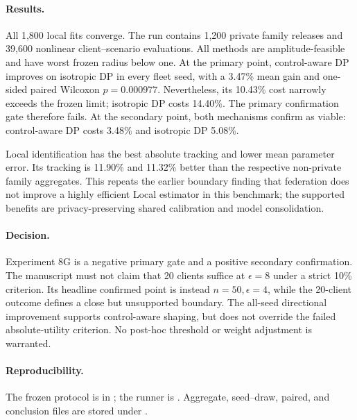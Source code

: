 \paragraph{Results.}
All 1,800 local fits converge. The run contains 1,200 private family releases
and 39,600 nonlinear client--scenario evaluations. All methods are
amplitude-feasible and have worst frozen radius below one. At the primary point,
control-aware DP improves on isotropic DP in every fleet seed, with a 3.47\%
mean gain and one-sided paired Wilcoxon $p=0.000977$. Nevertheless, its 10.43\%
cost narrowly exceeds the frozen limit; isotropic DP costs 14.40\%. The primary
confirmation gate therefore fails. At the secondary point, both mechanisms
confirm as viable: control-aware DP costs 3.48\% and isotropic DP 5.08\%.

Local identification has the best absolute tracking and lower mean parameter
error. Its tracking is 11.90\% and 11.32\% better than the respective
non-private family aggregates. This repeats the earlier boundary finding that
federation does not improve a highly efficient Local estimator in this
benchmark; the supported benefits are privacy-preserving shared calibration and
model consolidation.

\paragraph{Decision.}
Experiment 8G is a negative primary gate and a positive secondary confirmation.
The manuscript must not claim that 20 clients suffice at $\epsilon=8$ under a
strict 10\% criterion. Its headline confirmed point is instead
$n=50,\epsilon=4$, while the 20-client outcome defines a close but unsupported
boundary. The all-seed directional improvement supports control-aware shaping,
but does not override the failed absolute-utility criterion. No post-hoc
threshold or weight adjustment is warranted.

\paragraph{Reproducibility.}
The frozen protocol is in ; the runner is
. Aggregate,
seed--draw, paired, and conclusion files are stored under .
